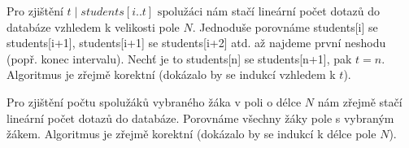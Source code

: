 \documentclass[12pt]{article}
\begin{document}
\noindent
Pro zjištění $t \mid students[i..t] \text{ spolužáci}$ nám stačí lineární počet
dotazů do databáze vzhledem k velikosti pole $N$. Jednoduše porovnáme
students[i] se students[i+1], students[i+1] se students[i+2] atd. až najdeme
první neshodu (popř. konec intervalu). Nechť je to students[n] se students[n+1],
pak $t=n$. Algoritmus je zřejmě korektní (dokázalo by se indukcí vzhledem k $t$).

\noindent
Pro zjištění počtu spolužáků vybraného žáka v poli o délce $N$ nám zřejmě
stačí lineární počet dotazů do databáze. Porovnáme všechny žáky pole s vybraným
žákem. Algoritmus je zřejmě korektní (dokázalo by se indukcí k délce pole $N$).


\end{document}
